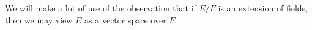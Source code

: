 \documentclass[12pt]{article}
\theoremstyle{definition}
\theoremstyle{definition}
\begin{document}
We will make a lot of use of the observation that if $E/F$ is an extension
of fields, then we may view $E$ as a vector space over $F$.





\end{document}
